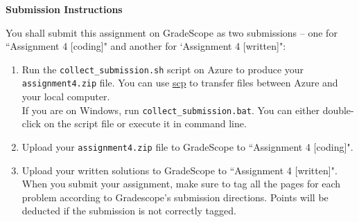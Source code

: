 \Large{\textbf{Submission Instructions}}

\normalsize
You shall submit this assignment on GradeScope as two submissions -- one for ``Assignment 4 [coding]" and another for `Assignment 4 [written]":
\begin{enumerate}
    \item Run the \texttt{collect\_submission.sh} script on Azure to produce your \texttt{assignment4.zip} file. You can use \href{http://www.hypexr.org/linux_scp_help.php}{scp} to transfer files between Azure and your local computer. \\
    If you are on Windows, run \texttt{collect\_submission.bat}. You can either double-click on the script file or execute it in command line. 
    \item Upload your \texttt{assignment4.zip} file to GradeScope to ``Assignment 4 [coding]".
    \item Upload your written solutions to GradeScope to ``Assignment 4 [written]". When you submit your assignment, make sure to tag all the pages for each problem according to Gradescope's submission directions. Points will be deducted if the submission is not correctly tagged.
\end{enumerate}
